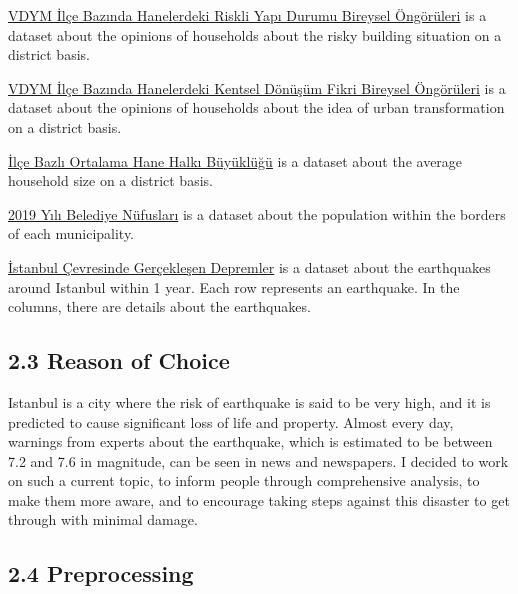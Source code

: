 \documentclass[
  11pt,
  a4paper,
  DIV=11,
  numbers=noendperiod]{scrartcl}
\begin{document}
\href{https://data.ibb.gov.tr/dataset/vdym-ilce-bazinda-hanelerdeki-riskli-yapi-durumu-bireysel-ongoruleri/resource/52fe7088-62f2-4480-8f27-788dee385c9b}{VDYM
İlçe Bazında Hanelerdeki Riskli Yapı Durumu Bireysel Öngörüleri} is a
dataset about the opinions of households about the risky building
situation on a district basis.

\href{https://data.ibb.gov.tr/dataset/vdym-ilce-bazinda-hanelerdeki-kentsel-donusum-fikri-bireysel-ongoruleri/resource/2683ee8b-9bc3-45cf-a115-49b285851317}{VDYM
İlçe Bazında Hanelerdeki Kentsel Dönüşüm Fikri Bireysel Öngörüleri} is a
dataset about the opinions of households about the idea of urban
transformation on a district basis.

\href{https://data.ibb.gov.tr/dataset/ilce-bazli-ortalama-hane-halki-buyuklugu/resource/da747beb-df41-474e-aa8a-93d983e69b15}{İlçe
Bazlı Ortalama Hane Halkı Büyüklüğü} is a dataset about the average
household size on a district basis.

\href{https://data.ibb.gov.tr/dataset/belediye-nufuslari-veri-seti/resource/c6c9b289-2824-41b3-ab3d-4fd655ed4e24}{2019
Yılı Belediye Nüfusları} is a dataset about the population within the
borders of each municipality.

\href{https://data.ibb.gov.tr/dataset/istanbul-da-son-bir-yilda-gerceklesen-depremler/resource/32904f60-8091-4dc3-b527-351dca6c1c22}{İstanbul
Çevresinde Gerçekleşen Depremler} is a dataset about the earthquakes
around Istanbul within 1 year. Each row represents an earthquake. In the
columns, there are details about the earthquakes.

\hypertarget{reason-of-choice}{%
\subsection{2.3 Reason of Choice}\label{reason-of-choice}}

Istanbul is a city where the risk of earthquake is said to be very high,
and it is predicted to cause significant loss of life and property.
Almost every day, warnings from experts about the earthquake, which is
estimated to be between 7.2 and 7.6 in magnitude, can be seen in news
and newspapers. I decided to work on such a current topic, to inform
people through comprehensive analysis, to make them more aware, and to
encourage taking steps against this disaster to get through with minimal
damage.

\hypertarget{preprocessing}{%
\subsection{2.4 Preprocessing}\label{preprocessing}}
\end{document}
